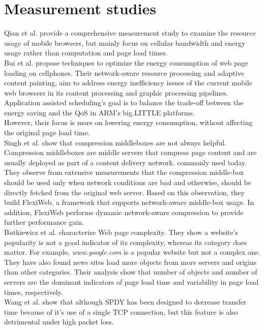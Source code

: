 \section{Measurement studies}
Qian et al. \cite{qian_mobisys2014} provide a comprehensive measurement study to  examine  the resource usage of mobile browsers, but mainly focus on cellular bandwidth and energy usage rather than computation and page load times.\\

\noindent Bui et al. \cite{bui2015rethinking} propose techniques to optimize the energy consumption of web page loading on cellphones.
Their network-aware resource processing and adaptive content painting, aim to address energy inefficiency issues of the current mobile web browsers in its content processing and graphic processing pipelines.\\
Application assisted scheduling's goal is  to balance the trade-off between the energy saving and the QoS in ARM's big.LITTLE platforms.\\
However, their focus is more on lowering energy consumption, without affecting the original page load time.\\

\noindent Singh et al. \cite{singh2015flexiweb} show that compression middleboxes are not always helpful. Compression middleboxes are middle servers that compress page content and are usually deployed as part of a content delivery network.
commonly used today. 
 They observe from extensive measurements that the compression middle-box should be used only when network conditions are bad and otherwise, should be directly fetched from the original web server. 
Based on this observation, they build FlexiWeb, a framework that supports network-aware middle-box usage. In addition, FlexiWeb  performs dynamic network-aware compression to provide further performance gain.\\

\noindent Butkiewicz et al. \cite{butkiewicz2011understanding} characterize Web page complexity.
They show a website's popularity is not a good indicator of its complexity, whereas its category does matter. For example, {\em www.google.com} is a popular website but not a complex one.
They have also found news sites load more objects from more servers and origins than other categories. Their analysis show that number of objects and number of servers are the dominant indicators of page load time and variability in page load times, respectively.\\


\noindent Wang et al. \cite{spdy_nsdi} show that although SPDY has been designed to decrease transfer time because of it's use of a single TCP connection, but this feature is also detrimental under high packet loss.





